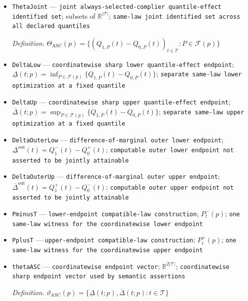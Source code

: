 \documentclass{article}
\begin{document}
\begin{itemize}
  \par\smallskip\noindent\emph{Definition.} \(\Delta_P(t)=Q_{1,P}(t)-Q_{0,P}(t)\)
  \item \texttt{ThetaJoint} --- \texttt{joint always-\allowbreak{}selected-\allowbreak{}complier quantile-\allowbreak{}effect identified set}; subsets of \(\mathbb R^{|\mathcal T|}\); \texttt{same-\allowbreak{}law joint identified set across all declared quantiles}
  \par\smallskip\noindent\emph{Definition.} \(\Theta_{\mathrm{ASC}}(p)=\{(Q_{1,P}(t)-Q_{0,P}(t))_{t\in\mathcal T}:P\in\mathcal F(p)\}\)
  \item \texttt{DeltaLow} --- \texttt{coordinatewise sharp lower quantile-\allowbreak{}effect endpoint}; \(\underline\Delta(t;p)=\inf_{P\in\mathcal F(p)}\{Q_{1,P}(t)-Q_{0,P}(t)\}\); \texttt{separate same-\allowbreak{}law lower optimization at a fixed quantile}
  \item \texttt{DeltaUp} --- \texttt{coordinatewise sharp upper quantile-\allowbreak{}effect endpoint}; \(\overline\Delta(t;p)=\sup_{P\in\mathcal F(p)}\{Q_{1,P}(t)-Q_{0,P}(t)\}\); \texttt{separate same-\allowbreak{}law upper optimization at a fixed quantile}
  \item \texttt{DeltaOuterLow} --- \texttt{difference-\allowbreak{}of-\allowbreak{}marginal outer lower endpoint}; \(\underline\Delta^{\mathrm{out}}(t)=Q_1^{-}(t)-Q_0^{+}(t)\); \texttt{computable outer lower endpoint not asserted to be jointly attainable}
  \item \texttt{DeltaOuterUp} --- \texttt{difference-\allowbreak{}of-\allowbreak{}marginal outer upper endpoint}; \(\overline\Delta^{\mathrm{out}}(t)=Q_1^{+}(t)-Q_0^{-}(t)\); \texttt{computable outer upper endpoint not asserted to be jointly attainable}
  \item \texttt{PminusT} --- \texttt{lower-\allowbreak{}endpoint compatible-\allowbreak{}law construction}; \(P_t^{-}(p)\); \texttt{one same-\allowbreak{}law witness for the coordinatewise lower endpoint}
  \item \texttt{PplusT} --- \texttt{upper-\allowbreak{}endpoint compatible-\allowbreak{}law construction}; \(P_t^{+}(p)\); \texttt{one same-\allowbreak{}law witness for the coordinatewise upper endpoint}
  \item \texttt{thetaASC} --- \texttt{coordinatewise endpoint vector}; \(\mathbb R^{2|\mathcal T|}\); \texttt{coordinatewise sharp endpoint vector used by semantic assertions}
  \par\smallskip\noindent\emph{Definition.} \(\vartheta_{\mathrm{ASC}}(p)=\{\underline\Delta(t;p),\overline\Delta(t;p):t\in\mathcal T\}\)

\end{itemize}
\end{document}
